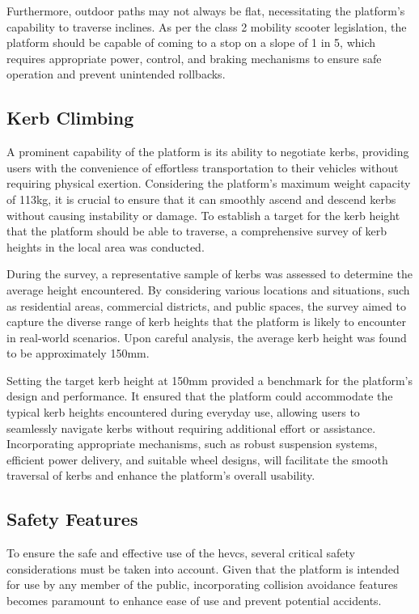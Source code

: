 \documentclass [12pt]{article}
\begin{document}
Furthermore, outdoor paths may not always be flat, necessitating the platform's capability to traverse inclines. As per the class 2 mobility scooter legislation, the platform should be capable of coming to a stop on a slope of 1 in 5, which requires appropriate power, control, and braking mechanisms to ensure safe operation and prevent unintended rollbacks.

\subsection{Kerb Climbing}

A prominent capability of the platform is its ability to negotiate kerbs, providing users with the convenience of effortless transportation to their vehicles without requiring physical exertion. Considering the platform's maximum weight capacity of 113kg, it is crucial to ensure that it can smoothly ascend and descend kerbs without causing instability or damage. To establish a target for the kerb height that the platform should be able to traverse, a comprehensive survey of kerb heights in the local area was conducted.

During the survey, a representative sample of kerbs was assessed to determine the average height encountered. By considering various locations and situations, such as residential areas, commercial districts, and public spaces, the survey aimed to capture the diverse range of kerb heights that the platform is likely to encounter in real-world scenarios. Upon careful analysis, the average kerb height was found to be approximately 150mm.

Setting the target kerb height at 150mm provided a benchmark for the platform's design and performance. It ensured that the platform could accommodate the typical kerb heights encountered during everyday use, allowing users to seamlessly navigate kerbs without requiring additional effort or assistance. Incorporating appropriate mechanisms, such as robust suspension systems, efficient power delivery, and suitable wheel designs, will facilitate the smooth traversal of kerbs and enhance the platform's overall usability.

\subsection{Safety Features}

To ensure the safe and effective use of the \gls{hevcs}, several critical safety considerations must be taken into account. Given that the platform is intended for use by any member of the public, incorporating collision avoidance features becomes paramount to enhance ease of use and prevent potential accidents.
\end{document}
